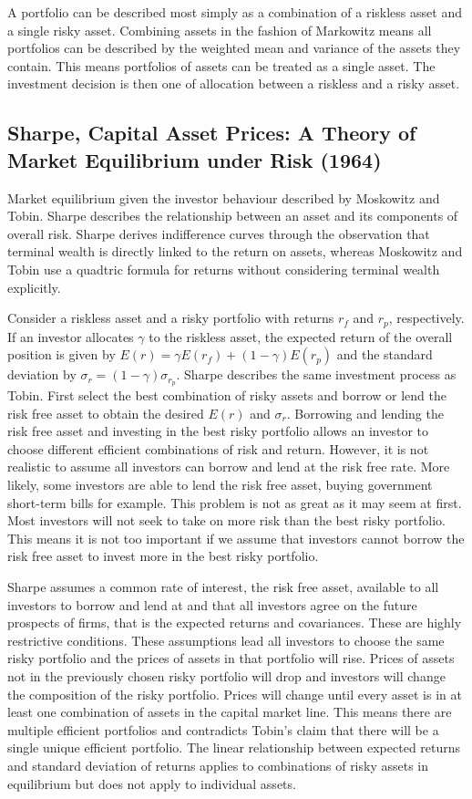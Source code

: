 A portfolio can be described most simply as a combination of a riskless asset and a single
risky asset. Combining assets in the fashion of Markowitz means all portfolios can be
described by the weighted mean and variance of the assets they contain. This means
portfolios of assets can be treated as a single asset. The investment decision is then one
of allocation between a riskless and a risky asset.

\subsection[Sharpe, 1964]{Sharpe, Capital Asset Prices: A Theory of Market Equilibrium
under Risk (1964)\cite{sharpe1964capital}}

Market equilibrium given the investor behaviour described by Moskowitz and Tobin. Sharpe
describes the relationship between an asset and its components of overall risk. Sharpe
derives indifference curves through the observation that terminal wealth is directly
linked to the return on assets, whereas Moskowitz and Tobin use a quadtric formula for
returns without considering terminal wealth explicitly.

Consider a riskless asset and a risky portfolio with returns $r_f$ and $r_p$,
respectively. If an investor allocates $\gamma$ to the riskless asset, the expected return
of the overall position is given by $E(r)=\gamma E(r_f)+(1-\gamma)E(r_p)$ and the standard
deviation by $\sigma_r=(1-\gamma)\sigma_{r_p}$. Sharpe describes the same investment
process as Tobin. First select the best combination of risky assets and borrow or lend the
risk free asset to obtain the desired $E(r)$ and $\sigma_r$. Borrowing and lending the
risk free asset and investing in the best risky portfolio allows an investor to choose
different efficient combinations of risk and return. However, it is not realistic to
assume all investors can borrow and lend at the risk free rate. More likely, some
investors are able to lend the risk free asset, buying government short-term bills for
example. This problem is not as great as it may seem at first. Most investors will not
seek to take on more risk than the best risky portfolio. This means it is not too
important if we assume that investors cannot borrow the risk free asset to invest more in
the best risky portfolio.

Sharpe assumes a common rate of interest, the risk free asset, available to all investors
to borrow and lend at and that all investors agree on the future prospects of firms, that
is the expected returns and covariances. These are highly restrictive conditions. These
assumptions lead all investors to choose the same risky portfolio and the prices of assets
in that portfolio will rise. Prices of assets not in the previously chosen risky portfolio
will drop and investors will change the composition of the risky portfolio. Prices will
change until every asset is in at least one combination of assets in the capital market
line. This means there are multiple efficient portfolios and contradicts Tobin's claim
that there will be a single unique efficient portfolio. The linear relationship between
expected returns and standard deviation of returns applies to combinations of risky assets
in equilibrium but does not apply to individual assets.

